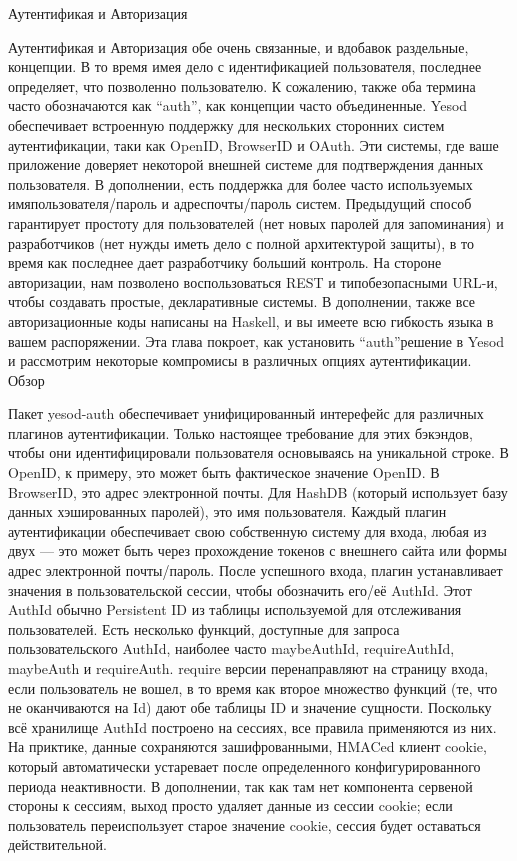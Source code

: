 Аутентификая и Авторизация

Аутентификая и Авторизация обе очень связанные, и вдобавок раздельные, концепции. В то время имея дело с идентификацией пользователя, последнее определяет, что позволенно пользователю. К сожалению, также оба термина часто обозначаются как \textquotedblleft auth\textquotedblright, как концепции часто объединенные.
Yesod обеспечивает встроенную поддержку для нескольких сторонних систем аутентификации, таки как OpenID, BrowserID и OAuth. Эти системы, где ваше приложение доверяет некоторой внешней системе для подтверждения данных пользователя. В дополнении, есть поддержка для более часто используемых имяпользователя/пароль и адреспочты/пароль систем. Предыдущий способ гарантирует простоту для пользователей (нет новых паролей для запоминания) и разработчиков (нет нужды иметь дело с полной архитектурой защиты), в то время как последнее дает разработчику больший контроль.
На стороне авторизации, нам позволено воспользоваться REST и типобезопасными URL-и, чтобы создавать простые, декларативные системы. В дополнении, также все авторизационные коды написаны на Haskell, и вы имеете всю гибкость языка в вашем распоряжении.
Эта глава покроет, как установить \textquotedblleft auth\textquotedblright решение в Yesod и рассмотрим некоторые компромисы в различных опциях аутентификации.
Обзор

Пакет yesod-auth обеспечивает унифицированный интерефейс для различных плагинов аутентификации. Только настоящее требование для этих бэкэндов, чтобы они идентифицировали пользователя основываясь на уникальной строке. В OpenID, к примеру, это может быть фактическое значение OpenID. В BrowserID, это адрес электронной почты. Для HashDB (который использует базу данных хэшированных паролей), это имя пользователя.
Каждый плагин аутентификации обеспечивает свою собственную систему для входа, любая из двух — это может быть через прохождение токенов с внешнего сайта или формы адрес электронной почты/пароль. После успешного входа, плагин устанавливает значения в пользовательской сессии, чтобы обозначить его/её AuthId. Этот AuthId обычно Persistent ID из таблицы используемой для отслеживания пользователей. 
Есть несколько функций, доступные для запроса пользовательского AuthId, наиболее часто maybeAuthId, requireAuthId, maybeAuth и requireAuth. require версии перенаправляют на страницу входа, если пользователь не вошел, в то время как второе множество функций (те, что не оканчиваются на Id) дают обе таблицы ID и значение сущности.
Поскольку всё хранилище AuthId построено на сессиях, все правила применяются из них. На приктике, данные сохраняются зашифрованными, HMACed клиент cookie, который автоматически устаревает после определенного конфигурированного периода неактивности. В дополнении, так как там нет компонента сервеной стороны к сессиям, выход просто удаляет данные из сессии cookie; если пользователь переиспользует старое значение cookie, сессия будет оставаться действительной.